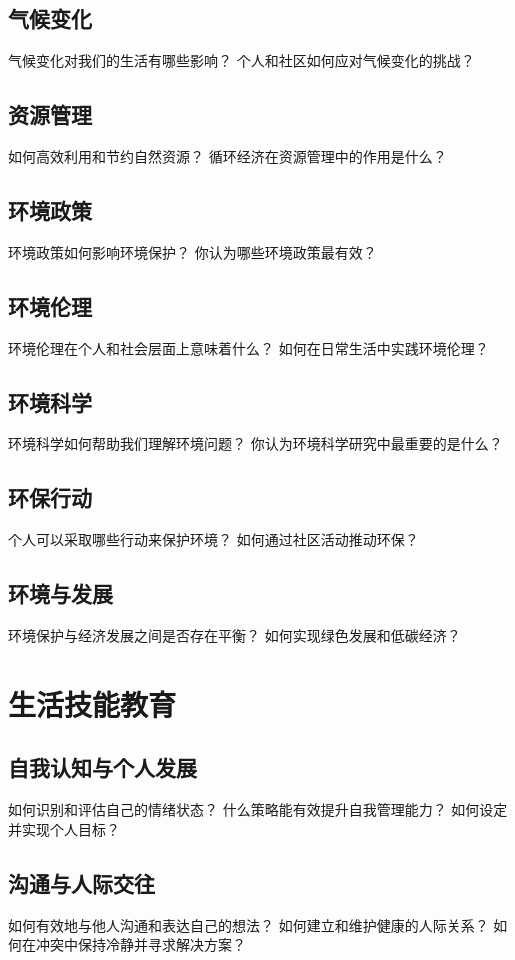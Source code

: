 \documentclass[12pt]{book}
\begin{document}
\subsection{气候变化}
气候变化对我们的生活有哪些影响？
个人和社区如何应对气候变化的挑战？

\subsection{资源管理}
如何高效利用和节约自然资源？
循环经济在资源管理中的作用是什么？

\subsection{环境政策}
环境政策如何影响环境保护？
你认为哪些环境政策最有效？

\subsection{环境伦理}
环境伦理在个人和社会层面上意味着什么？
如何在日常生活中实践环境伦理？

\subsection{环境科学}
环境科学如何帮助我们理解环境问题？
你认为环境科学研究中最重要的是什么？

\subsection{环保行动}
个人可以采取哪些行动来保护环境？
如何通过社区活动推动环保？

\subsection{环境与发展}
环境保护与经济发展之间是否存在平衡？
如何实现绿色发展和低碳经济？


\section{生活技能教育}
\subsection{自我认知与个人发展}

如何识别和评估自己的情绪状态？
什么策略能有效提升自我管理能力？
如何设定并实现个人目标？

\subsection{沟通与人际交往}
如何有效地与他人沟通和表达自己的想法？
如何建立和维护健康的人际关系？
如何在冲突中保持冷静并寻求解决方案？
\end{document}
